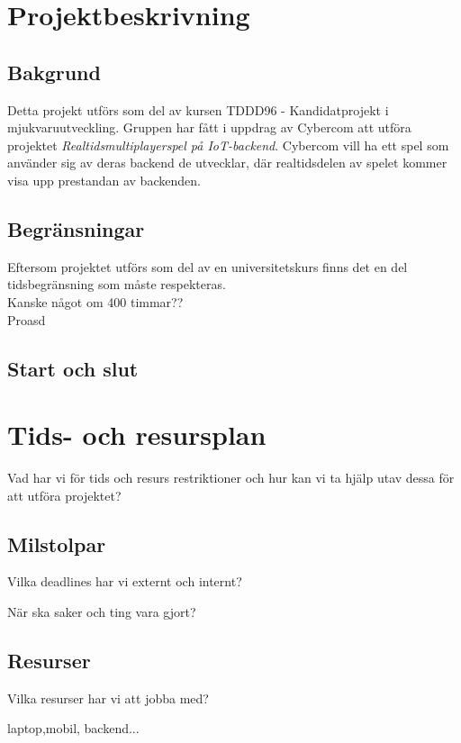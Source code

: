 \section{Projektbeskrivning}

\subsection{Bakgrund}
Detta projekt utförs som del av kursen TDDD96 - Kandidatprojekt i \\mjukvaruutveckling. Gruppen har fått i uppdrag av Cybercom att utföra projektet \textit{Realtidsmultiplayerspel på IoT-backend}. Cybercom vill ha ett spel som använder sig av deras backend de utvecklar, där realtidsdelen av spelet kommer visa upp prestandan av backenden.

\subsection{Begränsningar}
Eftersom projektet utförs som del av en universitetskurs finns det en del tidsbegränsning som måste respekteras.\\Kanske något om 400 timmar??\\
Proasd



\subsection{Start och slut}


\section{Tids- och resursplan}
Vad har vi för tids och resurs restriktioner och hur kan vi ta hjälp utav dessa för att utföra 
projektet?

\subsection{Milstolpar}
Vilka deadlines har vi externt och internt?

När ska saker och ting vara gjort?
\subsection{Resurser}
Vilka resurser har vi att jobba med?

laptop,mobil, backend...